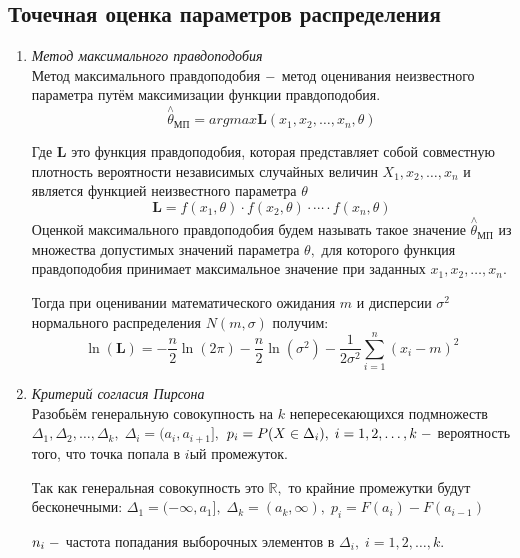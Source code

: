 \documentclass[a4]{article}
\begin{document}
	\subsection{Точечная оценка параметров распределения} %
		\label{sub:точечная_оценка_параметров_распределения}
	\begin{enumerate}
			\item \textit{Метод максимального правдоподобия}\\
	Метод максимального правдоподобия $\--$ метод оценивания неизвестного параметра путём максимизации функции правдоподобия.
	\begin{equation}
	    \overset{\wedge}{\theta}_{\text{МП}}=argmax \mathbf{L}(x_1,x_2,\ldots,x_n,\theta)
	\end{equation}

	Где $\mathbf{L}$ это функция правдоподобия, которая представляет собой совместную плотность вероятности независимых случайных величин $X_1,x_2,\ldots,x_n$ и является функцией неизвестного параметра $\theta$
	\begin{equation}
	    \mathbf{L} = f(x_1,\theta)\cdot f(x_2,\theta)\cdot\cdots\cdot f(x_n,\theta)
	\end{equation}
	Оценкой максимального правдоподобия будем называть такое значение $\overset{\wedge}{\theta}_{\text{МП}}$ из множества допустимых значений параметра $\theta,$ для которого функция правдоподобия принимает максимальное значение при заданных $x_1,x_2,\ldots,x_n.$

	Тогда при оценивании математического ожидания $m$ и дисперсии $\sigma^2$ нормального распределения $N(m,\sigma)$ получим:
	\begin{equation}
	    \ln(\mathbf{L})=-\frac{n}{2}\ln(2\pi)-\frac{n}{2}\ln\left(\sigma^2\right)-\frac{1}{2\sigma^2}\sum\limits_{i=1}^n(x_i-m)^2
	\end{equation}
	\item \textit{Критерий согласия Пирсона}\\
	Разобьём генеральную совокупность на $k$ непересекающихся подмножеств $\Delta_1, \Delta_2,\ldots, \Delta_k,\;\Delta_i = (a_i,a_{i+1}],$ $p_i = P(X\in\Delta_i),\;i=1,2,\ldots,k\; \--$ вероятность того, что точка попала в $i$ый промежуток.

	Так как генеральная совокупность это $\mathbb{R},$ то крайние промежутки будут бесконечными: $\Delta_1=(-\infty,a_1],\;\Delta_k=(a_k,\infty),\;p_i = F(a_i)-F(a_{i-1})$

	$n_i\;\--$ частота попадания выборочных элементов в $\Delta_i,\;i=1,2,\ldots,k.$


\end{enumerate}
\end{document}
